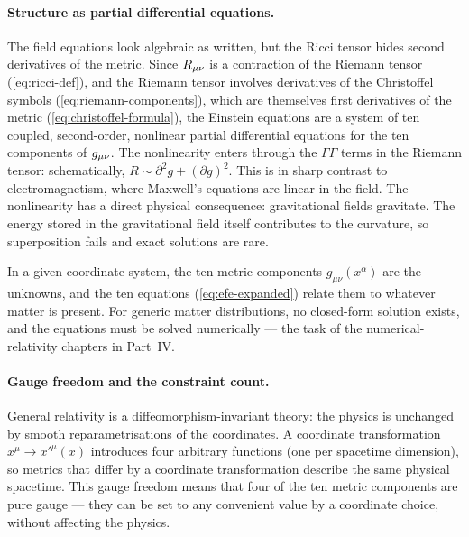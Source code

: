 \paragraph{Structure as partial differential equations.}

The field equations look algebraic as written, but the Ricci tensor hides
second derivatives of the metric.  Since $R_{\mu\nu}$ is a contraction of the
Riemann tensor (\cref{eq:ricci-def}), and the Riemann tensor involves
derivatives of the Christoffel symbols (\cref{eq:riemann-components}), which
are themselves first derivatives of the metric
(\cref{eq:christoffel-formula}), the Einstein equations are a system of ten
coupled, second-order, nonlinear partial differential equations for the ten
components of $g_{\mu\nu}$.  The nonlinearity enters through the
$\Gamma\Gamma$ terms in the Riemann tensor: schematically,
$R \sim \partial^2 g + (\partial g)^2$.  This is in sharp contrast to
electromagnetism, where Maxwell's equations are linear in the field.
The nonlinearity has a direct physical consequence: gravitational fields
gravitate.  The energy stored in the gravitational field itself contributes
to the curvature, so superposition fails and exact solutions are rare.

In a given coordinate system, the ten metric components
$g_{\mu\nu}(x^\alpha)$ are the unknowns, and the ten equations
(\cref{eq:efe-expanded}) relate them to whatever matter is present.  For
generic matter distributions, no closed-form solution exists, and the
equations must be solved numerically --- the task of the numerical-relativity
chapters in Part~IV.

\paragraph{Gauge freedom and the constraint count.}

General relativity is a diffeomorphism-invariant theory: the physics is
unchanged by smooth reparametrisations of the coordinates.  A coordinate
transformation $x^\mu \to x'^\mu(x)$ introduces four arbitrary functions
(one per spacetime dimension), so metrics that differ by a coordinate
transformation describe the same physical spacetime.  This gauge freedom
means that four of the ten metric components are pure gauge --- they can be
set to any convenient value by a coordinate choice, without affecting the
physics.


